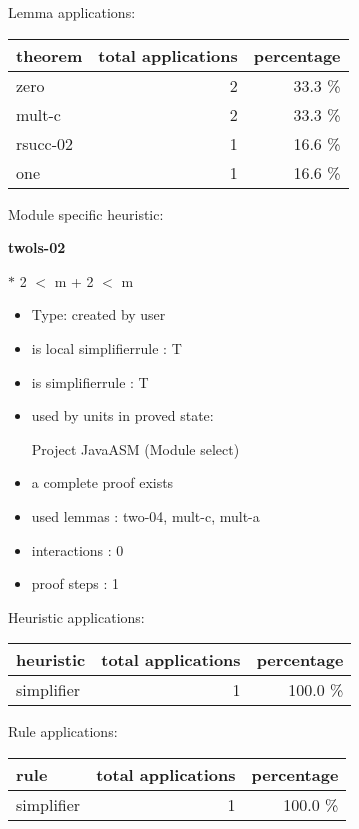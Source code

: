 \documentclass[a4paper]{article}
\begin{document}
Lemma applications:

\begin{supertabular}{l|r|r}
theorem	        & total applications & percentage \\ \hline
zero & 2 & 33.3 \% \\
mult-c & 2 & 33.3 \% \\
rsucc-02 & 1 & 16.6 \% \\
one & 1 & 16.6 \% \\

\end{supertabular}

Module specific heuristic:

\pagebreak

{\LARGE\bf twols-02}\label{lemma-twols-02}

\medskip

  $*$ 2 $<$ m + 2  $<$ m

\begin{itemize}

\item Type: created by user

\item is local simplifierrule : T
\item is simplifierrule : T
\item used by units in proved state:

Project JavaASM (Module select)
\item       a complete proof exists
\item       used lemmas  : two-04, mult-c, mult-a
\item       interactions : 0
\item       proof steps  : 1
\end{itemize}

\medskip


Heuristic applications:

\begin{supertabular}{l|r|r}
heuristic	& total applications & percentage \\ \hline
simplifier & 1 & 100.0 \% \\

\end{supertabular}

Rule applications:

\begin{supertabular}{l|r|r}
rule	        & total applications & percentage \\ \hline
simplifier & 1 & 100.0 \% \\

\end{supertabular}
\end{document}
